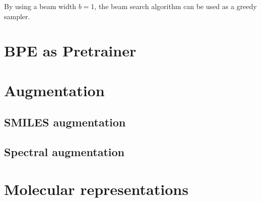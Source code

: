 By using a beam width $b=1$, the beam search algorithm can be used as a greedy sampler.


\section{BPE as Pretrainer}
\label{sec:bpe}

\section{Augmentation}
\label{sec:augmentation}

\subsection{SMILES augmentation}

\subsection{Spectral augmentation}

\section{Molecular representations}
\label{sec:representations}
